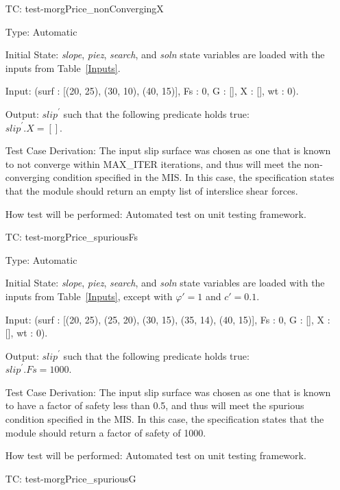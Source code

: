 \documentclass[12pt, titlepage]{article}
\newcounter{utestnum} %
\begin{document}
\begin{enumerate}[label=TC\arabic*:,ref={\arabic*}]
	\item [TC\refstepcounter{utestnum}\theutestnum: 
	\label{TC_MorgPriceNonConvergingX}] 
	test-morgPrice\_nonConvergingX
	
	Type: Automatic
	
	Initial State: \textit{slope}, \textit{piez}, \textit{search}, and 
	\textit{soln} state variables are loaded with the inputs from 
	Table~\ref{Inputs}.
	
	Input: (surf : [(20, 25), (30, 10), (40, 15)], Fs : 0, G : [], X : [], wt : 
	0).
	
	Output: $\textit{slip}^\prime$ such that the following predicate holds 
	true:\\ 
	$\textit{slip}^\prime.\textit{X} = []$.
	
	Test Case Derivation: The input slip surface was chosen as one that is 
	known to not converge within MAX\_ITER iterations, and thus will meet the 
	non-converging condition specified in the MIS. In this case, the 
	specification states that the module should return an empty list of 
	interslice shear forces.
	
	How test will be performed: Automated test on unit testing framework.
	
	\item [TC\refstepcounter{utestnum}\theutestnum: 
	\label{TC_MorgPriceSpuriousFs}] 
	test-morgPrice\_spuriousFs
	
	Type: Automatic
	
	Initial State: \textit{slope}, \textit{piez}, \textit{search}, and 
	\textit{soln} state variables are loaded with the inputs from 
	Table~\ref{Inputs}, except with $\varphi' = 1$ and $c' = 0.1$.
	
	Input: (surf : [(20, 25), (25, 20), (30, 15), (35, 14), (40, 15)], Fs : 0, 
	G : [], X : [], wt : 0).
	
	Output: $\textit{slip}^\prime$ such that the following predicate holds 
	true:\\ 
	$\textit{slip}^\prime.\textit{Fs} = 1000$.
	
	Test Case Derivation: The input slip surface was chosen as one that is 
	known to have a factor of safety less than 0.5, and thus will meet the 
	spurious condition specified in the MIS. In this case, the specification 
	states that the module should return a factor of safety of 1000.
	
	How test will be performed: Automated test on unit testing framework.
	
	\item [TC\refstepcounter{utestnum}\theutestnum: 
	\label{TC_MorgPriceSpuriousG}] 
	test-morgPrice\_spuriousG
	

\end{enumerate}
\end{document}
